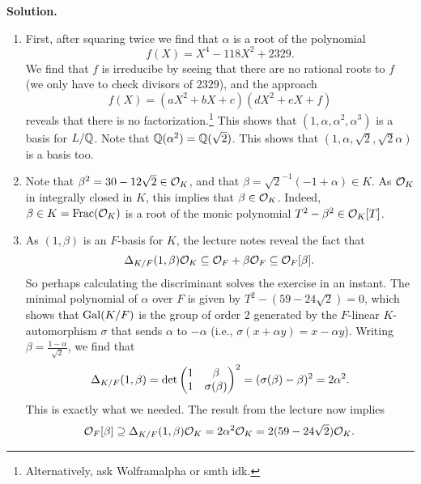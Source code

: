 \documentclass[a4paper,11pt]{article}
\begin{document}
\textbf{Solution.}
\begin{enumerate}
    \item First, after squaring twice we find that $\alpha$ is a root of the
        polynomial
        \begin{equation*}
            f(X) = X^4 - 118X^2 + 2329.
        \end{equation*}
        We find that $f$ is irreducibe by seeing that there are no rational roots to $f$
        (we only have to check divisors of $2329$), and the approach
        \begin{equation*}
            f(X) = (aX^2 + bX + c)(dX^2 + eX + f)
        \end{equation*}
        reveals that there is no factorization.\footnote{Alternatively, ask Wolframalpha
        or smth idk.} This shows that 
        $(1, \alpha, \alpha^2, \alpha^3)$ is a basis for $L/\mathbb{Q}$. Note that
        $\mathbb{Q}(\alpha^2) = \mathbb{Q}(\sqrt 2)$. This shows that $(1, \alpha, \sqrt 2, \sqrt 2 \alpha)$
        is a basis too.
    \item Note that $\beta^2 = 30 - 12\sqrt 2 \in \mathcal{O}_K$, and that $\beta = \sqrt 2^{-1}
        (-1 + \alpha) \in K$. As $\mathcal{O}_K$ in integrally closed in $K$, this implies that 
        $\beta \in \mathcal{O}_K$. Indeed, $\beta \in K = \mathrm{Frac} (\mathcal{O}_K)$ is a root of the monic
        polynomial $T^2 - \beta^2 \in \mathcal{O}_K[T]$.
    \item As $(1, \beta)$ is an $F$-basis for $K$, the lecture notes reveal the
        fact that $$\Delta_{K/F}(1, \beta) \mathcal{O}_K \subseteq \mathcal{O}_F + \beta \mathcal{O}_F
        \subseteq \mathcal{O}_F[\beta].$$ So perhaps calculating
        the discriminant solves the exercise in an instant. 
        The minimal polynomial of $\alpha$ over $F$ is given by $T^2 - (59 -
        24\sqrt 2) = 0$, which shows that $\operatorname{Gal}(K/F)$ is the group of order $2$
        generated by the $F$-linear $K$-automorphism $\sigma$ that sends $\alpha$ to 
        $-\alpha$ (i.e., $\sigma(x + \alpha y) = x - \alpha y$). Writing $\beta = \frac {1 - \alpha}{\sqrt 2}$, we find that 
        \begin{equation*}
            \Delta_{K/F}(1, \beta) = \det \begin{pmatrix} 1 & \beta\\ 1 & \sigma(\beta) \end{pmatrix}^2
            = (\sigma(\beta) - \beta)^2 = 2 \alpha^2.
        \end{equation*}
        This is exactly what we needed. The result from the lecture now implies
        \begin{equation*}
            \mathcal{O}_F[\beta] \supseteq \Delta_{K/F}(1, \beta) \mathcal{O}_K
            = 2 \alpha^2 \mathcal{O}_K = 2(59 - 24\sqrt 2) \mathcal{O}_K.
        \end{equation*}

        
\end{enumerate}


\contactend
\end{document}
